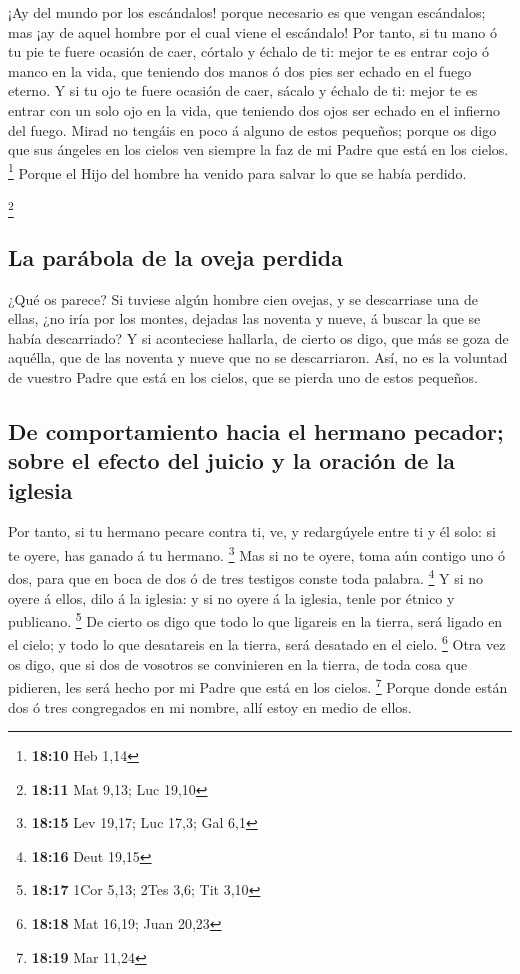 ¡Ay del mundo por los escándalos! porque necesario es que
vengan escándalos; mas ¡ay de aquel hombre por el cual viene el
escándalo!  Por tanto, si tu mano ó tu pie te fuere ocasión
de caer, córtalo y échalo de ti: mejor te es entrar cojo ó manco en la
vida, que teniendo dos manos ó dos pies ser echado en el fuego eterno.
 Y si tu ojo te fuere ocasión de caer, sácalo y échalo de
ti: mejor te es entrar con un solo ojo en la vida, que teniendo dos ojos
ser echado en el infierno del fuego.  Mirad no tengáis en
poco á alguno de estos pequeños; porque os digo que sus ángeles en los
cielos ven siempre la faz de mi Padre que está en los cielos.
\footnote{\textbf{18:10} Heb 1,14}  Porque el Hijo del
hombre ha venido para salvar lo que se había perdido.

\footnote{\textbf{18:11} Mat 9,13; Luc 19,10}

\hypertarget{la-paruxe1bola-de-la-oveja-perdida}{%
\subsection{La parábola de la oveja
perdida}\label{la-paruxe1bola-de-la-oveja-perdida}}

 ¿Qué os parece? Si tuviese algún hombre cien ovejas, y se
descarriase una de ellas, ¿no iría por los montes, dejadas las noventa y
nueve, á buscar la que se había descarriado?  Y si
aconteciese hallarla, de cierto os digo, que más se goza de aquélla, que
de las noventa y nueve que no se descarriaron.  Así, no es
la voluntad de vuestro Padre que está en los cielos, que se pierda uno
de estos pequeños.

\hypertarget{de-comportamiento-hacia-el-hermano-pecador-sobre-el-efecto-del-juicio-y-la-oraciuxf3n-de-la-iglesia}{%
\subsection{De comportamiento hacia el hermano pecador; sobre el efecto
del juicio y la oración de la
iglesia}\label{de-comportamiento-hacia-el-hermano-pecador-sobre-el-efecto-del-juicio-y-la-oraciuxf3n-de-la-iglesia}}

 Por tanto, si tu hermano pecare contra ti, ve, y
redargúyele entre ti y él solo: si te oyere, has ganado á tu hermano.
\footnote{\textbf{18:15} Lev 19,17; Luc 17,3; Gal 6,1}  Mas
si no te oyere, toma aún contigo uno ó dos, para que en boca de dos ó de
tres testigos conste toda palabra. \footnote{\textbf{18:16} Deut 19,15}
 Y si no oyere á ellos, dilo á la iglesia: y si no oyere á
la iglesia, tenle por étnico y publicano. \footnote{\textbf{18:17} 1Cor
  5,13; 2Tes 3,6; Tit 3,10}  De cierto os digo que todo lo
que ligareis en la tierra, será ligado en el cielo; y todo lo que
desatareis en la tierra, será desatado en el cielo. \footnote{\textbf{18:18}
  Mat 16,19; Juan 20,23}  Otra vez os digo, que si dos de
vosotros se convinieren en la tierra, de toda cosa que pidieren, les
será hecho por mi Padre que está en los cielos. \footnote{\textbf{18:19}
  Mar 11,24}  Porque donde están dos ó tres congregados en
mi nombre, allí estoy en medio de ellos.


